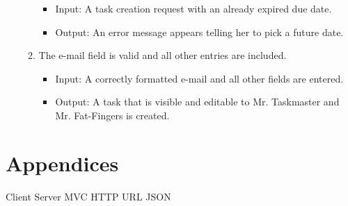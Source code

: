 \documentclass{article}
\begin{document}
\begin{enumerate}
\begin{enumerate}
            \begin{itemize}
                \item Input: A task creation request with an already expired due date.
                \item Output: An error message appears telling her to pick a future date.
            \end{itemize}
        \item The e-mail field is valid and all other entries are included.
            \begin{itemize}
                \item Input: A correctly formatted e-mail and all other fields are entered.
                \item Output: A task that is visible and editable to Mr. Taskmaster and Mr. Fat-Fingers is created. 
            \end{itemize}
    \end{enumerate}   
\end{enumerate}


\newpage
\section{Appendices}

Client Server
MVC
HTTP
URL
JSON
\end{document}

